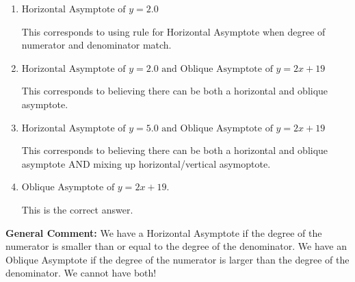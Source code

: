 \documentclass{extbook}[14pt]
\begin{document}
\begin{enumerate}
{\begin{enumerate}[label=\Alph*.]
This corresponds to considering where the denominator is equal to 0 as horizontal asymptote.
\item \( \text{Horizontal Asymptote of } y = 2.0  \)

This corresponds to using rule for Horizontal Asymptote when degree of numerator and denominator match.
\item \( \text{Horizontal Asymptote of } y = 2.0 \text{ and Oblique Asymptote of } y = 2x + 19 \)

This corresponds to believing there can be both a horizontal and oblique asymptote.
\item \( \text{Horizontal Asymptote of } y = 5.0 \text{ and Oblique Asymptote of } y = 2x + 19 \)

This corresponds to believing there can be both a horizontal and oblique asymptote AND mixing up horizontal/vertical asymoptote.
\item \( \text{Oblique Asymptote of } y = 2x + 19. \)

This is the correct answer.
\end{enumerate}

\textbf{General Comment:} We have a Horizontal Asymptote if the degree of the numerator is smaller than or equal to the degree of the denominator. We have an Oblique Asymptote if the degree of the numerator is larger than the degree of the denominator. We cannot have both!
}
\end{enumerate}
\end{document}
